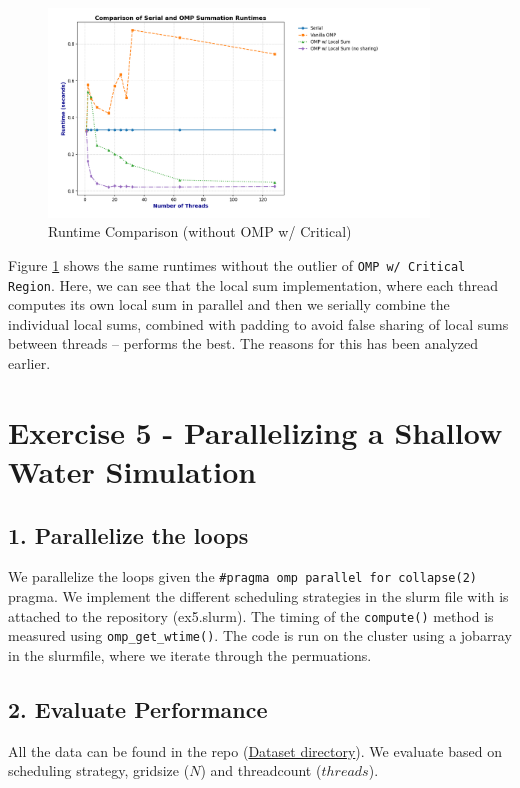 \documentclass[a4paper,10pt]{article}
\begin{document}
\begin{figure}[H]
  \centering
  \includegraphics[width=0.9\textwidth]{img/ex3/ex3_comparison_no_critical.png}
  \caption{Runtime Comparison (without OMP w/ Critical)}
  \label{fig:ex3_runtime_no_critical}
\end{figure}

Figure \ref{fig:ex3_runtime_no_critical} shows the same runtimes without the outlier of \verb|OMP w/ Critical Region|. Here, we can see that the local sum implementation, where each thread computes its own local sum in parallel and then we serially combine the individual local sums, combined with padding to avoid false sharing of local sums between threads -- performs the best. The reasons for this has been analyzed earlier. 

\section{Exercise 5 - Parallelizing a Shallow Water Simulation}
\subsection{1. Parallelize the loops}
We parallelize the loops given the \verb|#pragma omp parallel for collapse(2)| pragma. 
We implement the different scheduling strategies in the slurm file with is attached to the repository (ex5.slurm).
The timing of the \verb|compute()| method is measured using \verb|omp_get_wtime()|.
The code is run on the cluster using a jobarray in the slurmfile, where we iterate through the permuations.

\subsection{2. Evaluate Performance}
All the data can be found in the repo (\href{https://github.com/paulmyr/DD2356-MethodsHPC/tree/master/3_open_mp/exercise5/data}{Dataset directory}).
We evaluate based on scheduling strategy, gridsize ($N$) and threadcount ($threads$).
\end{document}

